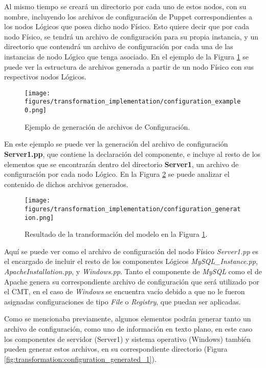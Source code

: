 Al mismo tiempo se creará un directorio por cada uno de estos nodos, con su nombre, incluyendo los archivos de configuración de Puppet correspondientes a los nodos Lógicos que posea dicho nodo Físico. Esto quiere decir que por cada nodo Físico, se tendrá un archivo de configuración para su propia instancia, y un directorio que contendrá un archivo de configuración por cada una de las instancias de nodo Lógico que tenga asociado.
En el ejemplo de la Figura \ref{fig:transformation:configuration} se puede ver la estructura de archivos generada a partir de un nodo Físico con sus respectivos nodos Lógicos.

\begin{figure}[htbp]
    \centering
    \texttt{[image: figures/transformation\_implementation/configuration\_example0.png]}
    \caption{Ejemplo de generación de archivos de Configuración.}
    \label{fig:transformation:configuration}
\end{figure}

En este ejemplo se puede ver la generación del archivo de configuración \textbf{Server1.pp}, que contiene la declaración del componente, e incluye al resto de los elementos que se encontrarán dentro del directorio \textbf{Server1}, un archivo de configuración por cada nodo Lógico. 
En la Figura \ref{fig:transformation:configuration_generated} se puede analizar el contenido de dichos archivos generados.

\begin{figure}[htbp]
    \centering
    \texttt{[image: figures/transformation\_implementation/configuration\_generation.png]}
    \caption{Resultado de la transformación del modelo en la Figura \ref{fig:transformation:configuration}.}
    \label{fig:transformation:configuration_generated}
\end{figure}

Aquí se puede ver como el archivo de configuración del nodo Físico \textit{Server1.pp} es el encargado de incluir el resto de los componentes Lógicos \textit{MySQL\_Instance.pp}, \textit{ApacheInstallation.pp}, y \textit{Windows.pp}.
Tanto el componente de \textit{MySQL} como el de Apache genera su correspondiente archivo de configuración que será utilizado por el CMT, en el caso de \textit{Windows} se encuentra vacío debido a que no le fueron asignadas configuraciones de tipo \textit{File} o \textit{Registry}, que puedan ser aplicadas.

Como se mencionaba previamente, algunos elementos podrán generar tanto un archivo de configuración, como uno de información en texto plano, en este caso los componentes de servidor (Server1) y sistema operativo (Windows) también pueden generar estos archivos, en su correspondiente directorio (Figura \ref{fig:transformation:configuration_generated_1}).

